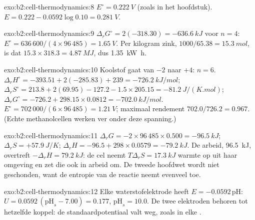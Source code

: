 \begin{solution}{exo:b2:cell-thermodynamics:8}
$E^\circ = \qty{0.222}{V}$ (zoals in het hoofdstuk). $E = 0.222 - 0.0592\log 0.10 =
\qty{0.281}{V}$.
\end{solution}

\begin{solution}{exo:b2:cell-thermodynamics:9}
$\Delta_r G^\circ = 2(-318.30) = \qty{-636.6}{kJ}$ voor $n = 4$: $E^\circ =
636\,600/(4 \times 96\,485) = \qty{1.65}{V}$. Per kilogram zink, $1000/65.38 =
\qty{15.3}{mol}$, is dat $15.3 \times 318.3 = \qty{4.87}{MJ}$, dus \qty{1.35}{kW.h}.
\end{solution}

\begin{solution}{exo:b2:cell-thermodynamics:10}
Koolstof gaat van $-2$ naar $+4$: $n = 6$. $\Delta_r H^\circ = -393.51 + 2(-285.83) +
239 = \qty{-726.2}{kJ/mol}$; $\Delta_r S^\circ = 213.8 + 2(69.95) - 127.2 - 1.5
\times 205.15 = \qty{-81.2}{J/(K.mol)}$; $\Delta_r G^\circ = -726.2 + 298.15 \times
0.0812 = \qty{-702.0}{kJ/mol}$. $E^\circ = 702\,000/(6 \times 96\,485) =
\qty{1.21}{V}$; maximaal rendement $702.0/726.2 = 0.967$. (Echte methanolcellen
werken ver onder deze spanning.)
\end{solution}

\begin{solution}{exo:b2:cell-thermodynamics:11}
$\Delta_r G = -2 \times 96\,485 \times 0.500 = \qty{-96.5}{kJ}$; $\Delta_r S = +\qty{57.9}{J/K}$;
$\Delta_r H = -96.5 + 298 \times 0.0579 = \qty{-79.2}{kJ}$. De arbeid, \qty{96.5}{kJ},
overtreft $-\Delta_r H = \qty{79.2}{kJ}$: de cel neemt $T\Delta_r S = \qty{17.3}{kJ}$
warmte op uit haar omgeving en zet die ook in arbeid om. De tweede hoofdwet
wordt niet geschonden, want de entropie van de reactie neemt evenveel toe.
\end{solution}

\begin{solution}{exo:b2:cell-thermodynamics:12}
Elke waterstofelektrode heeft $E = -0.0592\,\mathrm{pH}$: $U = 0.0592\,(\mathrm{pH}_s -
7.00) = 0.177$, $\mathrm{pH}_s = 10.0$. De twee elektroden behoren tot hetzelfde koppel:
de standaardpotentiaal valt weg, zoals in elke .
\end{solution}

